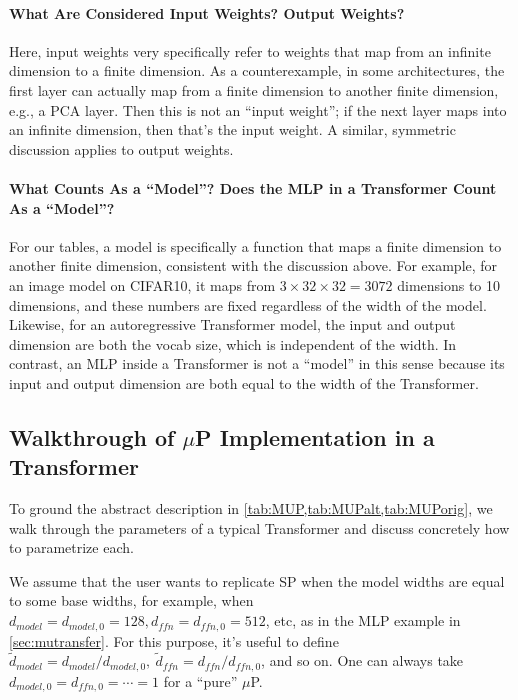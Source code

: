 \documentclass{article}
\theoremstyle{definition}
\begin{document}
\paragraph{What Are Considered Input Weights? Output Weights?}
Here, input weights very specifically refer to weights that map from an infinite dimension to a finite dimension.
As a counterexample, in some architectures, the first layer can actually map from a finite dimension to another finite dimension, e.g., a PCA layer.
Then this is not an ``input weight''; if the next layer maps into an infinite dimension, then that's the input weight.
A similar, symmetric discussion applies to output weights.

\paragraph{What Counts As a ``Model''? Does the MLP in a Transformer Count As a ``Model''?}
For our tables, a model is specifically a function that maps a finite dimension to another finite dimension, consistent with the discussion above.
For example, for an image model on CIFAR10, it maps from $3 \times 32 \times 32 = 3072$ dimensions to 10 dimensions, and these numbers are fixed regardless of the width of the model.
Likewise, for an autoregressive Transformer model, the input and output dimension are both the vocab size, which is independent of the width.
In contrast, an MLP inside a Transformer is not a ``model'' in this sense because its input and output dimension are both equal to the width of the Transformer.

\subsection{Walkthrough of \texorpdfstring{$\mu$P}{muP} Implementation in a Transformer}

To ground the abstract description in \cref{tab:MUP,tab:MUPalt,tab:MUPorig}, we walk through the parameters of a typical Transformer and discuss concretely how to parametrize each.

We assume that the user wants to replicate SP when the model widths are equal to some base widths, for example, when $d_{model} = d_{model,0} = 128, d_{ffn} = d_{ffn,0} = 512$, etc, as in the MLP example in \cref{sec:mutransfer}.
For this purpose, it's useful to define $\tilde d_{model} = d_{model} / d_{model,0},\ \tilde d_{ffn} = d_{ffn} / d_{ffn,0}$, and so on.
One can always take $d_{model,0} = d_{ffn,0} = \cdots = 1$ for a ``pure'' $\mu$P.
\end{document}
